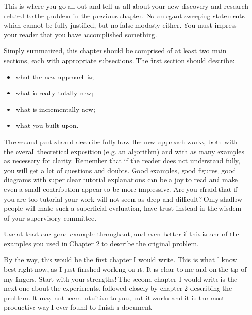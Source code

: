 \label{chapter:newsol}

This is where you go all out and tell us all about your new discovery and research related to the problem in the previous chapter. No arrogant sweeping statements which cannot be fully justified, but no false modesty either. You must impress your reader that you have accomplished something.

Simply summarized, this chapter should be comprised of at least two main sections, each with appropriate subsections. The first section should describe:
\begin{itemize}
\item {what the new approach is;}
\item {what is really totally new;}
\item {what is incrementally new;}
\item {what you built upon.}
\end{itemize}

The second part should describe fully how the new approach works, both with the overall theoretical exposition (e.g. an algorithm) and with as many examples as necessary for clarity. Remember that if the reader does not understand fully, you will get a lot of questions and doubts. Good examples, good figures, good diagrams with super clear tutorial explanations can be a joy to read and make even a small contribution appear to be more impressive. Are you afraid that if you are too tutorial your work will not seem as deep and difficult? Only shallow people will make such a superficial evaluation, have trust instead in the wisdom of your supervisory committee.

Use at least one good example throughout, and even better if this is one of the examples you used in Chapter 2 to describe the original problem.

By the way, this would be the first chapter I would write. This is what I know best right now, as I just finished working on it. It is clear to me and on the tip of my fingers. Start with your strengths! The second chapter I would write is the next one about the experiments, followed closely by chapter 2 describing the problem. It may not seem intuitive to you, but it works and it is the most productive way I ever found to finish a document.



